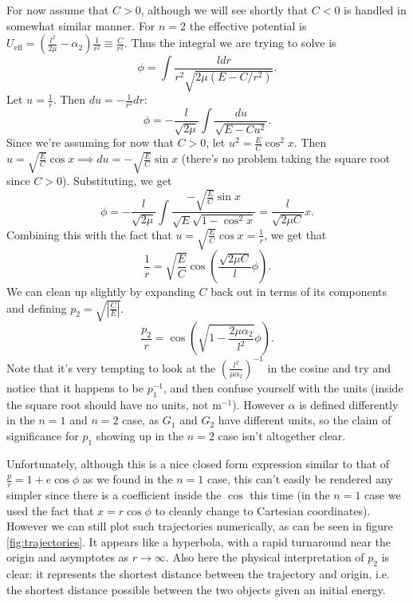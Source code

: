 \documentclass[letterpaper, reqno,11pt]{article}
\begin{document}
For now assume that $C>0$, although we will see shortly that $C<0$ is handled in somewhat similar manner. For $n=2$ the effective potential is $U_{\text{eff}}=\left( \frac{l^2}{2\mu}-\alpha_2 \right)\frac{1}{r^2}\equiv \frac{C}{r^2}$. Thus the integral we are trying to solve is 
\[
\phi=\int \frac{ldr}{r^2\sqrt{2\mu\left( E-C /r^2 \right) } }
.\]
Let $u=\frac{1}{r}$. Then $du=-\frac{1}{r^2} dr$: 
\[
\phi = -\frac{l}{\sqrt{2\mu} }\int \frac{du}{\sqrt{E-Cu^2} }
.\]
Since we're assuming for now that $C>0$, let $u^2=\frac{E}{C}\cos^2 x$. Then $u=\sqrt{\frac{E}{C}}\cos x\implies du=-\sqrt{\frac{E}{C}}\sin x$ (there's no problem taking the square root since $C>0$). Substituting, we get
\[
\phi=-\frac{l}{\sqrt{2\mu} }\int \frac{-\sqrt{\frac{E}{C}}\sin x }{\sqrt{E} \sqrt{1-\cos^2x} }=\frac{l}{\sqrt{2\mu C}}x
.\]
Combining this with the fact that $u=\sqrt{\frac{E}{C}}\cos x=\frac{1}{r}$, we get that
\[
\frac{1}{r}=\sqrt{\frac{E}{C}}\cos\left( \frac{\sqrt{2\mu C}}{l}\phi  \right)  
.\]
We can clean up slightly by expanding $C$ back out in terms of its components and defining $p_2=\sqrt{\left|\frac{C}{E}\right|} $. 
\begin{equation}\label{eq:C>0}
\frac{p_2}{r}=\cos\left( \sqrt{1- \frac{2\mu\alpha_2}{l^2}} \phi \right) 
.\end{equation}
Note that it's very tempting to look at the $\left( \frac{l^2}{\mu\alpha_2} \right)^{-1} $ in the cosine and try and notice that it happens to be $p_1^{-1}$, and then confuse yourself with the units (inside the square root should have no units, not $\text{m}^{-1}$). However $\alpha$ is defined differently in the $n=1$ and $n=2$ case, as $G_1$ and $G_2$ have different units, so the claim of significance for $ p_1$ showing up in the $n=2$ case isn't altogether clear. %


Unfortunately, although this is a nice closed form expression similar to that of $\frac{p}{r}=1+e\cos\phi$ as we found in the $n=1$ case, this can't easily be rendered any simpler since there is a coefficient inside the $\cos$ this time (in the $n=1$ case we used the fact that $x=r\cos\phi$ to cleanly change to Cartesian coordinates). However we can still plot such trajectories numerically, as can be seen in figure \ref{fig:trajectories}. It appears like a hyperbola, with a rapid turnaround near the origin and asymptotes as $r\to \infty$. Also here the physical interpretation of $p_2$ is clear: it represents the shortest distance between the trajectory and origin, i.e. the shortest distance possible between the two objects given an initial energy. 
\end{document}
